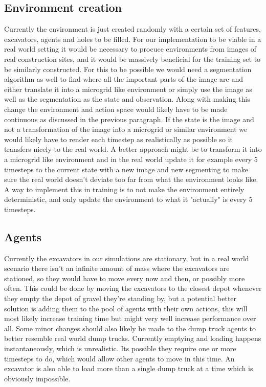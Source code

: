 \documentclass[conference]{IEEEtran}
\begin{document}
	\subsection{Environment creation}
	Currently the environment is just created randomly with a certain set of features, excavators, agents and holes to be filled.
	For our implementation to be viable in a real world setting it would be necessary to procuce environments from images of real construction sites, and it would be massively beneficial for the training set to be similarly constructed.
	For this to be possible we would need a segmentation algorithm as well to find where all the important parts of the image are and either translate it into a microgrid like environment or simply use the image as well as the segmentation as the state and observation.
	Along with making this change the environment and action space would likely have to be made continuous as discussed in the previous paragraph.
	If the state is the image and not a transformation of the image into a microgrid or similar environment we would likely have to render each timestep as realistically as possible so it transfers nicely to the real world.
	A better approach might be to transform it into a microgrid like environment and in the real world update it for example every 5 timesteps to the current state with a new image and new segmenting to make sure the real world doesn't deviate too far from what the environment looks like.
	A way to implement this in training is to not make the environment entirely deterministic, and only update the environment to what it "actually" is every 5 timesteps.

	\subsection{Agents}
	Currently the excavators in our simulations are stationary, but in a real world scenario there isn't an infinite amount of mass where the excavators are stationed, so they would have to move every now and then, or possibly more often.
	This could be done by moving the excavators to the closest depot whenever they empty the depot of gravel they're standing by, but a potential better solution is adding them to the pool of agents with their own actions, this will most likely increase training time but might very well increase performance over all.
	Some minor changes should also likely be made to the dump truck agents to better resemble real world dump trucks.
	Currently emptying and loading happens instantaneously, which is unrealistic. Its possible they require one or more timesteps to do, which would allow other agents to move in this time.
	An excavator is also able to load more than a single dump truck at a time which is obviously impossible.
\end{document}
